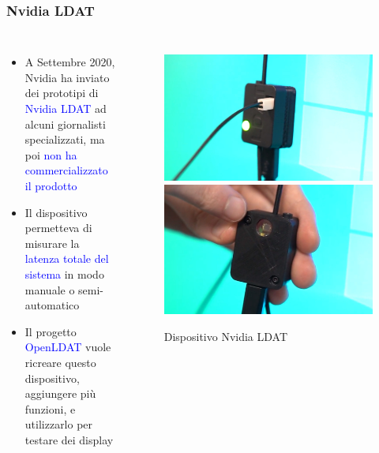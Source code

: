 \documentclass{beamer}
\begin{document}
\begin{frame}[shrink=10]
	\frametitle{Nvidia LDAT}
	\begin{columns}
		\begin{itemize}
			\item A Settembre 2020, Nvidia ha inviato dei prototipi di \textcolor{blue}{Nvidia LDAT} ad alcuni giornalisti specializzati, ma poi \textcolor{blue}{non ha commercializzato il prodotto}
			\item Il dispositivo permetteva di misurare la \textcolor{blue}{latenza totale del sistema} in modo manuale o semi-automatico
			\item Il progetto \textcolor{blue}{OpenLDAT} vuole ricreare questo dispositivo, aggiungere più funzioni, e utilizzarlo per testare dei display
		\end{itemize}
		\begin{figure}
			\centering
			\includegraphics[width=\textwidth]{StatoDellArte_files/nvldat_front.jpg}
			\includegraphics[width=\textwidth]{StatoDellArte_files/nvldat_back.jpg}
			\caption*{Dispositivo Nvidia LDAT}
		\end{figure}
		
	\end{columns}
	
\end{frame}
\end{document}
